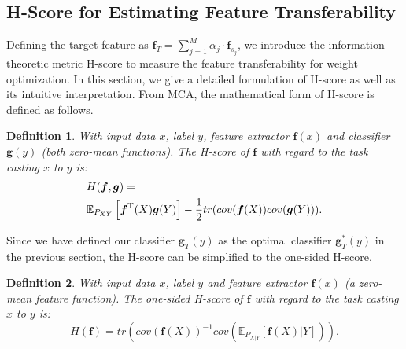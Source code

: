 \documentclass[letterpaper]{article} %
\newtheorem{definition}{Definition}
\begin{document}

\subsection{H-Score for Estimating Feature Transferability}

 Defining the target feature as $\boldsymbol{f}_T = \sum_{j=1}^M \alpha_j \cdot \boldsymbol{f}_{s_j}$, we introduce the information theoretic metric H-score \citep{huang2019information} to measure the feature transferability for weight optimization. In this section, we give a detailed formulation of H-score as well as its intuitive interpretation. From MCA, the mathematical form of H-score is defined as follows.

\begin{definition}
    With input data $x$, label $y$, feature extractor $\boldsymbol{f}(x)$ and classifier $\boldsymbol{g}(y)$ (both zero-mean functions). The H-score of $\boldsymbol{f}$ with regard to the task casting $x$ to $y$ is:
    \begin{align}
        &H(\boldsymbol{f},\boldsymbol{g}) = \nonumber\\
        &\mathbb{E}_{P_{XY}}\left[\boldsymbol{f}^{\rm T}(X)\boldsymbol{g}(Y)\right] - \frac{1}{2}tr(cov(\boldsymbol{f}(X)) cov(\boldsymbol{g}(Y))).
    \label{hscore}
    \end{align}
\label{def:hscore}
\end{definition}

Since we have defined our classifier $\boldsymbol{g}_T(y)$ as the optimal classifier $\boldsymbol{g}_T^*(y)$ in the previous section, the H-score can be simplified to the one-sided H-score.

\begin{definition}
    With input data $x$, label $y$ and feature extractor $\boldsymbol{f}(x)$ (a zero-mean feature function). The one-sided H-score of $\boldsymbol{f}$ with regard to the task casting $x$ to $y$ is:
    \begin{equation}
        H(\boldsymbol{f}) = tr(cov(\boldsymbol{f}(X))^{-1}cov(\mathbb{E}_{P_{X|Y}}[\boldsymbol{f}(X)|Y])).
    \label{singlehscore}
    \end{equation}
 \label{def:singlehscore}
\end{definition}
\end{document}
